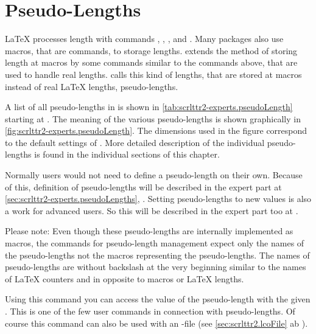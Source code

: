 \section{Pseudo-Lengths}
\label{sec:scrlttr2.pseudoLength}

\LaTeX{} processes length with commands , ,
, and . Many packages also use
macros, that are commands, to storage lengths. \KOMAScript{} extends the
method of storing length at macros by some commands similar to the commands
above, that are used to handle real lengths. \KOMAScript calls this kind of
lengths, that are stored at macros instead of real \LaTeX{} lengths,
pseudo-lengths.

A list of all pseudo-lengths in  is shown in
\autoref{tab:scrlttr2-experts.pseudoLength} starting at
. The meaning of the various
pseudo-lengths is shown graphically in
\autoref{fig:scrlttr2-experts.pseudoLength}. The dimensions used in the figure
correspond to the default settings of . More detailed
description of the individual pseudo-lengths is found in the individual
sections of this chapter.

Normally users would not need to define a pseudo-length on their own. Because
of this, definition of pseudo-lengths will be described in the expert part at
\autoref{sec:scrlttr2-experts.pseudoLengths},
. Setting pseudo-lengths to
new values is also a work for advanced users. So this will be described in the
expert part too at .

Please note: Even though these pseudo-lengths are
internally implemented as macros, the commands for pseudo-length management
expect only the names of the pseudo-lengths not the macros representing the
pseudo-lengths. The names of pseudo-lengths are without backslash at the very
beginning similar to the names of \LaTeX{} counters and in opposite to macros
or \LaTeX{} lengths.

\begin{Declaration}
\end{Declaration}
%
Using this command you can access the value of the pseudo-length with
the given . This is one of the few user commands in
connection with pseudo-lengths. Of course this command can also be
used with an -file (see
\autoref{sec:scrlttr2.lcoFile} ab ).%
%
%


